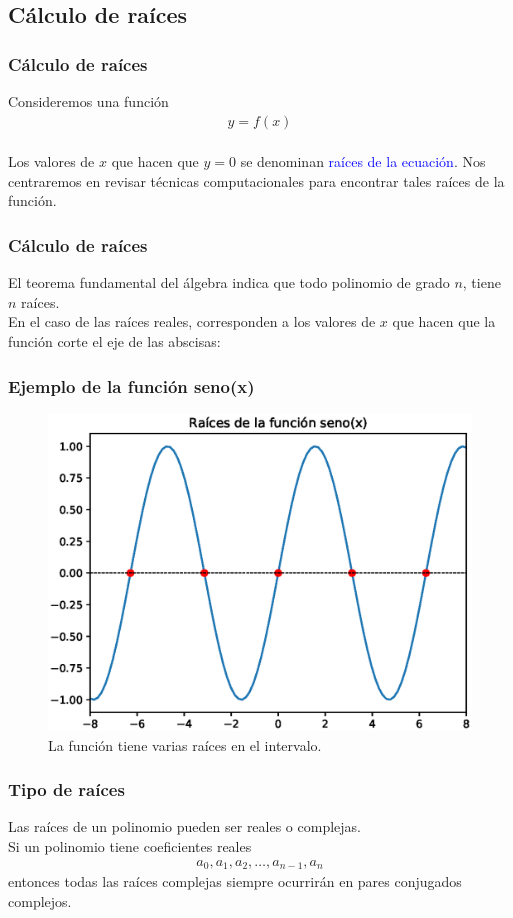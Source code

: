 \subsection{Cálculo de raíces}
\begin{frame}
\frametitle{Cálculo de raíces}
Consideremos una función 
\begin{align*}
y= f(x)
\end{align*}
\\
\bigskip
Los valores de $x$ que hacen que $y=0$ se denominan \textcolor{blue}{raíces de la ecuación}. Nos centraremos en revisar técnicas computacionales para encontrar tales raíces de la función.
\end{frame}
\begin{frame}
\frametitle{Cálculo de raíces}
El teorema fundamental del álgebra indica que todo polinomio de grado $n$, tiene $n$ raíces.
\\
\bigskip
En el caso de las raíces reales, corresponden a los valores de $x$ que hacen que la función corte el eje de las abscisas:
\end{frame}
\begin{frame}
\frametitle{Ejemplo de la función seno(x)}
\begin{figure}
	\centering
	\includegraphics[scale=0.5]{Imagenes/raices_seno_2020_00.eps}
	\caption{La función tiene varias raíces en el intervalo.} 
\end{figure}
\end{frame}
\begin{frame}
\frametitle{Tipo de raíces}
Las raíces de un polinomio pueden ser reales o complejas.
\\
\bigskip
Si un polinomio tiene coeficientes reales
\begin{align*}
a_{0}, a_{1}, a_{2}, \ldots, a_{n-1}, a_{n}
\end{align*}
entonces todas las raíces complejas siempre ocurrirán en pares conjugados complejos.
\end{frame}

